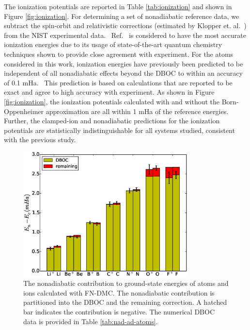 The ionization potentials are reported in Table \ref{tab:ionization} and shown in Figure \ref{fig:ionization}. For determining a set of nonadiabatic reference data, we subtract the spin-orbit and relativistic corrections (estimated by Klopper et. al.~\cite{Klopper_IP}) from the NIST experimental data.~\cite{NIST_Atoms} Ref.~\cite{Klopper_IP} is considered to have the most accurate ionization energies due to its usage of state-of-the-art quantum chemistry techniques shown to provide close agreement with experiment.
For the atoms considered in this work, ionization energies have previously been predicted to be independent of all nonadiabatic effects beyond the DBOC to within an accuracy of 0.1 mHa.~\cite{Klopper_IP} This prediction is based on calculations that are reported to be exact and agree to high accuracy with experiment. As shown in Figure \ref{fig:ionization}, the ionization potentials calculated with and without the Born-Oppenheimer approximation are all within 1 mHa of the reference energies. Further, the clamped-ion and nonadiabatic predictions for the ionization potentials are statistically indistinguishable for all systems studied, consistent with the previous study.~\cite{Klopper_IP}

\begin{figure}[h]
\centering
\includegraphics[width=0.8\textwidth]{atom-nad-ad}
\caption{The nonadiabatic contribution to ground-state energies of atoms and ions calculated with FN-DMC. The nonadiabatic contribution is partitioned into the DBOC and the remaining correction. A hatched bar indicates the contribution is negative. The numerical DBOC data is provided in Table \ref{tab:nad-ad-atoms}. \label{fig:atom-nad-ad}} %
\end{figure}


